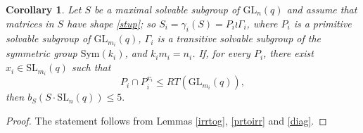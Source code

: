 \documentclass[a4paper,reqno,11pt]{amsart}
\newtheorem{Cor}[Th]{Corollary}
\theoremstyle{definition}
\theoremstyle{remark}
\newtheorem{Rem}[Th]{Remark}
\numberwithin{equation}{section}
\newcommand{\Sym}{\mathrm{Sym}}
\newcommand{\SL}{{\mathrm{SL}}}
\newcommand{\GL}{{\mathrm{GL}}}
\begin{document}
\begin{Cor}\label{corir}
Let $S$ be a maximal solvable subgroup of $\GL_n(q)$ and assume that matrices in $S$ have shape \eqref{stup}; so $S_i =\gamma_i(S)= P_{i} \wr \Gamma_i$,
where $P_{i}$ is a primitive solvable subgroup of $\GL_{m_i}(q)$, $\Gamma_i$ is a transitive solvable
subgroup of the symmetric group $\Sym(k_i)$, and $k_im_i = n_i$. If, for every $P_{i}$, there exist $x_i \in \SL_{m_i}(q)$ such that
\begin{equation*}%
P_{i} \cap P_{i}^{x_i}\le RT(\GL_{m_i}(q)),
\end{equation*}
then $b_S(S \cdot \SL_n(q))\le5.$
\end{Cor}
\begin{proof}
The statement follows  from Lemmas \ref{irrtog},  \ref{prtoirr} and  \ref{diag}.
\end{proof}

\end{document}
